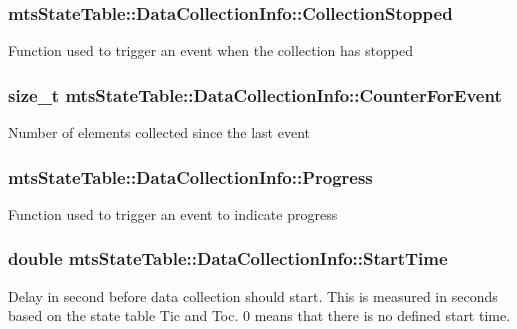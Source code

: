 \subsubsection[{Collection\+Stopped}]{ mts\+State\+Table\+::\+Data\+Collection\+Info\+::\+Collection\+Stopped}\label{classmts_state_table_1_1_data_collection_info_ae4ff6ebaf115c070c00ff0686997383f}
Function used to trigger an event when the collection has stopped \hypertarget{classmts_state_table_1_1_data_collection_info_aeefcc3cd75cdec6523e62fb6447b9aab}{}
\subsubsection[{Counter\+For\+Event}]{\setlength{\rightskip}{0pt plus 5cm}size\+\_\+t mts\+State\+Table\+::\+Data\+Collection\+Info\+::\+Counter\+For\+Event}\label{classmts_state_table_1_1_data_collection_info_aeefcc3cd75cdec6523e62fb6447b9aab}
Number of elements collected since the last event \hypertarget{classmts_state_table_1_1_data_collection_info_ae4e104e80fed9252cf855f90dee1a1b9}{}
\subsubsection[{Progress}]{ mts\+State\+Table\+::\+Data\+Collection\+Info\+::\+Progress}\label{classmts_state_table_1_1_data_collection_info_ae4e104e80fed9252cf855f90dee1a1b9}
Function used to trigger an event to indicate progress \hypertarget{classmts_state_table_1_1_data_collection_info_a6142e6c6599148b1eadf002c9880463f}{}
\subsubsection[{Start\+Time}]{\setlength{\rightskip}{0pt plus 5cm}double mts\+State\+Table\+::\+Data\+Collection\+Info\+::\+Start\+Time}\label{classmts_state_table_1_1_data_collection_info_a6142e6c6599148b1eadf002c9880463f}
Delay in second before data collection should start. This is measured in seconds based on the state table Tic and Toc. 0 means that there is no defined start time. \hypertarget{classmts_state_table_1_1_data_collection_info_a9b815a904966196b006f88d2dc0e73b4}{}
